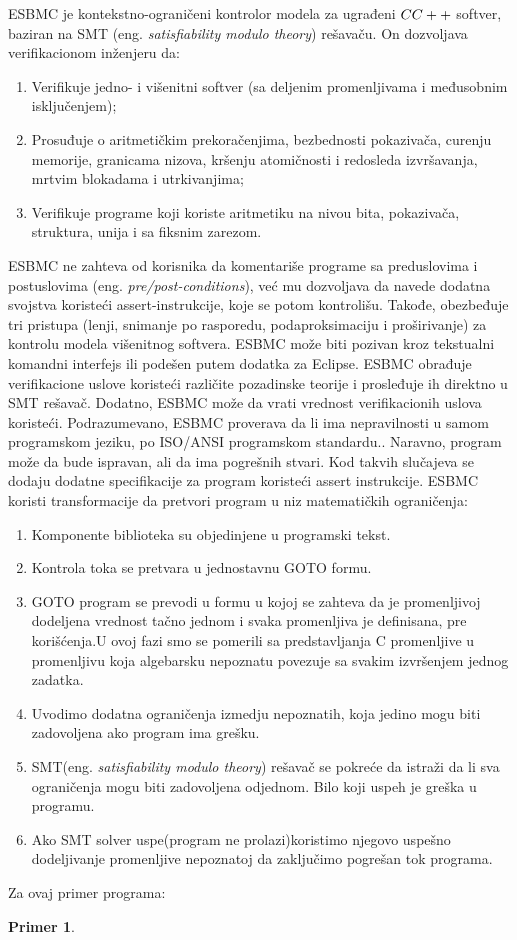 \documentclass[a4paper]{article}
\newtheorem{primer}{Primer}[section]
\begin{document}
{ESBMC je kontekstno-ograničeni kontrolor modela za ugrađeni $C\/C++$ softver, baziran na SMT (eng. \emph{satisfiability modulo theory}) rešavaču.  On dozvoljava verifikacionom inženjeru da: 
	\newline
	\begin{enumerate}
	\item Verifikuje jedno- i višenitni softver (sa deljenim promenljivama i međusobnim isključenjem);
	\item Prosuđuje o aritmetičkim prekoračenjima, bezbednosti pokazivača, curenju memorije, granicama nizova, kršenju atomičnosti i redosleda izvršavanja, mrtvim blokadama i utrkivanjima; 
	\item Verifikuje programe koji koriste aritmetiku na nivou bita, pokazivača, struktura, unija i sa fiksnim zarezom.
	\end{enumerate}
	ESBMC ne zahteva od korisnika da komentariše programe sa preduslovima i postuslovima (eng. \emph{pre/post-conditions}), već mu dozvoljava da navede dodatna svojstva koristeći assert-instrukcije, koje se potom kontrolišu. Takođe, obezbeđuje tri pristupa (lenji, snimanje po rasporedu, podaproksimaciju i proširivanje) za kontrolu modela višenitnog softvera. ESBMC može biti pozivan kroz tekstualni komandni interfejs ili podešen putem dodatka za Eclipse. ESBMC obrađuje verifikacione uslove koristeći različite pozadinske teorije i prosleđuje ih direktno u SMT rešavač. Dodatno, ESBMC može da vrati vrednost verifikacionih uslova koristeći.
	\newline
	Podrazumevano, ESBMC proverava da li ima nepravilnosti u samom programskom jeziku, po ISO/ANSI programskom standardu.. Naravno, program može da bude ispravan, ali da ima pogrešnih stvari. Kod takvih slučajeva se dodaju dodatne specifikacije za program koristeći assert instrukcije. 
	\newline
	ESBMC  koristi transformacije  da pretvori program u niz matematičkih ograničenja:
	\begin{enumerate}
	\item Komponente biblioteka su objedinjene u programski tekst.
	\item Kontrola toka se pretvara u jednostavnu GOTO formu.
	\item GOTO program se prevodi u formu  u kojoj se zahteva da je promenljivoj dodeljena vrednost tačno jednom i svaka promenljiva je definisana, pre korišćenja.U ovoj fazi smo se pomerili sa predstavljanja C promenljive u promenljivu koja algebarsku nepoznatu povezuje sa svakim izvršenjem jednog zadatka.
	\item Uvodimo dodatna ograničenja izmedju nepoznatih, koja jedino mogu biti zadovoljena ako program ima grešku.
	\item SMT(eng. \emph{satisfiability modulo theory}) rešavač se pokreće da istraži da li sva ograničenja mogu biti zadovoljena odjednom. Bilo koji uspeh je greška u programu.
	\item Ako SMT solver uspe(program ne prolazi)koristimo njegovo uspešno dodeljivanje promenljive nepoznatoj da zaključimo pogrešan tok programa.
	\end{enumerate}
	Za ovaj primer programa:
	\newline
	\begin{primer}


\end{primer}}
\end{document}
